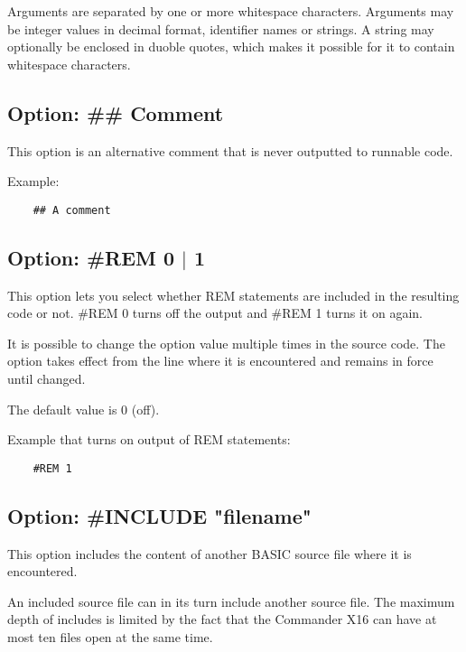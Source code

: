 \documentclass{article}
\begin{document}
        Arguments are separated by one or more whitespace characters.
        Arguments may be integer values in decimal format, identifier names or strings. 
        A string may optionally be enclosed in duoble quotes, which makes it possible 
        for it to contain whitespace characters.

    \subsection{Option: \#\# Comment}

        This option is an alternative comment that is never outputted to runnable
        code.

        Example:

        \begin{verbatim}
    ## A comment
        \end{verbatim}

    \subsection{Option: \#REM 0 $|$ 1}

        This option lets you select whether REM statements are included in
        the resulting code or not. \#REM 0 turns off the output and \#REM 1
        turns it on again.

        It is possible to change the option value multiple times in the
        source code. The option takes effect from the line where it is 
        encountered and remains in force until changed.

        The default value is 0 (off).

        Example that turns on output of REM statements:
        \begin{verbatim}
    #REM 1
        \end{verbatim}

    \subsection{Option: \#INCLUDE "filename"}

        This option includes the content of another BASIC source
        file where it is encountered.

        An included source file can in its turn include another
        source file. The maximum depth of includes is limited
        by the fact that the Commander X16 can have at most
        ten files open at the same time.
\end{document}
